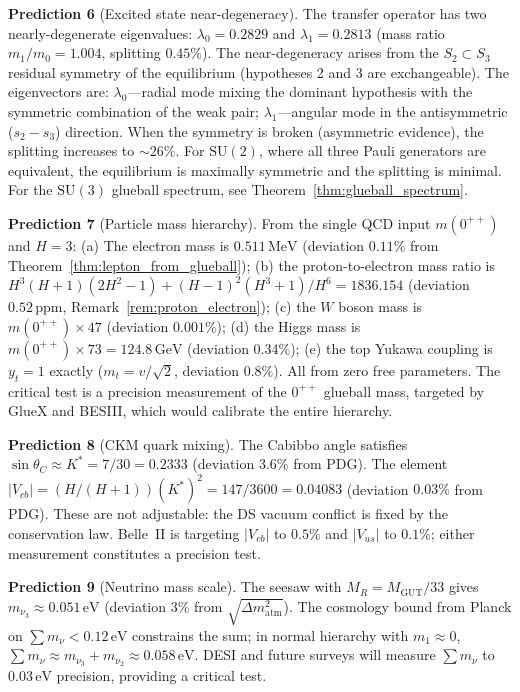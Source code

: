 \documentclass[11pt,a4paper]{article}
\theoremstyle{definition}
\theoremstyle{remark}
\newcommand{\SU}{\mathrm{SU}}
\begin{document}
\textbf{Prediction 6} (Excited state near-degeneracy). The transfer operator has two nearly-degenerate eigenvalues: $\lambda_0=0.2829$ and $\lambda_1=0.2813$ (mass ratio $m_1/m_0=1.004$, splitting $0.45\%$). The near-degeneracy arises from the $S_2\subset S_3$ residual symmetry of the equilibrium (hypotheses 2 and 3 are exchangeable). The eigenvectors are: $\lambda_0$---radial mode mixing the dominant hypothesis with the symmetric combination of the weak pair; $\lambda_1$---angular mode in the antisymmetric ($s_2-s_3$) direction. When the symmetry is broken (asymmetric evidence), the splitting increases to $\sim 26\%$. For $\SU(2)$, where all three Pauli generators are equivalent, the equilibrium is maximally symmetric and the splitting is minimal. For the $\SU(3)$ glueball spectrum, see Theorem~\ref{thm:glueball_spectrum}.

\textbf{Prediction 7} (Particle mass hierarchy). From the single QCD input $m(0^{++})$ and $H=3$: (a) The electron mass is $0.511\,\mathrm{MeV}$ (deviation $0.11\%$ from Theorem~\ref{thm:lepton_from_glueball}); (b) the proton-to-electron mass ratio is $H^3(H+1)(2H^2\!-\!1)+(H\!-\!1)^2(H^3\!+\!1)/H^6=1836.154$ (deviation $0.52\,\mathrm{ppm}$, Remark~\ref{rem:proton_electron}); (c) the $W$ boson mass is $m(0^{++})\times 47$ (deviation $0.001\%$); (d) the Higgs mass is $m(0^{++})\times 73 = 124.8\,\mathrm{GeV}$ (deviation $0.34\%$); (e) the top Yukawa coupling is $y_t=1$ exactly ($m_t=v/\sqrt{2}$, deviation $0.8\%$). All from zero free parameters. The critical test is a precision measurement of the $0^{++}$ glueball mass, targeted by GlueX and BESIII, which would calibrate the entire hierarchy.

\textbf{Prediction 8} (CKM quark mixing). The Cabibbo angle satisfies $\sin\theta_C\approx K^*=7/30=0.2333$ (deviation $3.6\%$ from PDG). The element $|V_{cb}|=(H/(H+1))(K^*)^2=147/3600=0.04083$ (deviation $0.03\%$ from PDG). These are not adjustable: the DS vacuum conflict is fixed by the conservation law. Belle~II is targeting $|V_{cb}|$ to $0.5\%$ and $|V_{us}|$ to $0.1\%$; either measurement constitutes a precision test.

\textbf{Prediction 9} (Neutrino mass scale). The seesaw with $M_R=M_\mathrm{GUT}/33$ gives $m_{\nu_3}\approx 0.051\,\mathrm{eV}$ (deviation $3\%$ from $\sqrt{\Delta m^2_\mathrm{atm}}$). The cosmology bound from Planck on $\sum m_\nu < 0.12\,\mathrm{eV}$ constrains the sum; in normal hierarchy with $m_1\approx 0$, $\sum m_\nu\approx m_{\nu_3}+m_{\nu_2}\approx 0.058\,\mathrm{eV}$. DESI and future surveys will measure $\sum m_\nu$ to $0.03\,\mathrm{eV}$ precision, providing a critical test.
\end{document}
